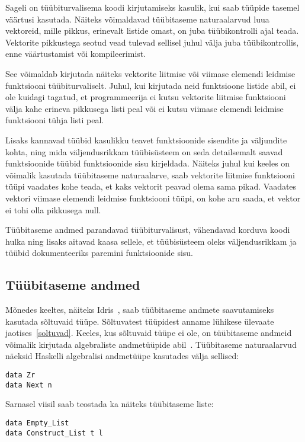 \documentclass[12pt]{article}
\begin{document}
    Sageli on tüübiturvalisema koodi kirjutamiseks kasulik, kui saab tüüpide tasemel väärtusi kasutada. Näiteks võimaldavad tüübitaseme naturaalarvud luua vektoreid, mille pikkus, erinevalt listide omast, on juba tüübikontrolli ajal teada. Vektorite pikkustega seotud vead tulevad sellisel juhul välja juba tüübikontrollis, enne väärtustamist või kompileerimist.

    See võimaldab kirjutada näiteks vektorite liitmise või viimase elemendi leidmise funktsiooni tüübiturvaliselt. Juhul, kui kirjutada neid funktsioone listide abil, ei ole kuidagi tagatud, et programmeerija ei kutsu vektorite liitmise funktsiooni välja kahe erineva pikkusega listi peal või ei kutsu viimase elemendi leidmise funktsiooni tühja listi peal.

    Lisaks kannavad tüübid kasulikku teavet funktsioonide sisendite ja väljundite kohta, ning mida väljendusrikkam tüübisüsteem on seda detailsemalt saavad funktsioonide tüübid funktsioonide sisu kirjeldada. Näiteks juhul kui keeles on võimalik kasutada tüübitaseme naturaalarve, saab vektorite liitmise funktsiooni tüüpi vaadates kohe teada, et kaks vektorit peavad olema sama pikad. Vaadates vektori viimase elemendi leidmise funktsiooni tüüpi, on kohe aru saada, et vektor ei tohi olla pikkusega null.

    Tüübitaseme andmed parandavad tüübiturvalisust, vähendavad korduva koodi hulka ning lisaks aitavad kaasa sellele, et tüübisüsteem oleks väljendusrikkam ja tüübid dokumenteeriks paremini funktsioonide sisu.
    \subsection{Tüübitaseme andmed}\label{tyybitasemeandmed}
      Mõnedes keeltes, näiteks Idris~\cite{The_Idr}, saab tüübitaseme andmete saavutamiseks kasutada sõltuvaid tüüpe. Sõltuvatest tüüpidest anname lühikese ülevaate jaotises~\ref{soltuvad}. Keeles, kus sõltuvaid tüüpe ei ole, on tüübitaseme andmeid võimalik kirjutada algebraliste andmetüüpide abil~\cite{Giv}. Tüübitaseme naturaalarvud näeksid Haskelli algebralisi andmetüüpe kasutades välja sellised:

      \begin{verbatim}data Zr
data Next n\end{verbatim}

      Sarnasel viisil saab teostada ka näiteks tüübitaseme liste:

      \begin{verbatim}data Empty_List
data Construct_List t l\end{verbatim}
\end{document}
